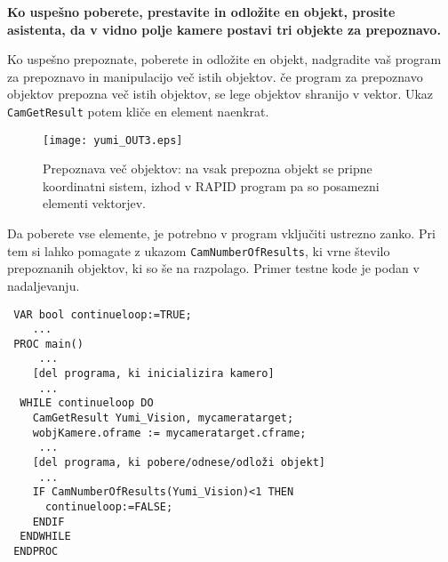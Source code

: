\vspace{5mm}
\begin{mdframed}[backgroundcolor=red!20, shadow=true,roundcorner=8pt]
\textbf{Ko uspešno poberete, prestavite in odložite en objekt, prosite asistenta, da v vidno polje kamere postavi tri objekte za prepoznavo.}
\end{mdframed}

Ko uspešno prepoznate, poberete in odložite en objekt, nadgradite vaš program za prepoznavo in manipulacijo več istih objektov.  če program za prepoznavo objektov prepozna več istih objektov, se lege objektov shranijo v vektor. Ukaz \verb"CamGetResult" potem kliče en element naenkrat.


\begin{figure}[!hbt]
\centering
\texttt{[image: yumi\_OUT3.eps]}
\caption{Prepoznava več objektov: na vsak prepozna objekt se pripne koordinatni sistem, izhod v RAPID program pa so posamezni elementi vektorjev.}
\label{fig:yumi_vision}
\end{figure}


Da poberete vse elemente, je potrebno v program vključiti ustrezno zanko. Pri tem si lahko pomagate z ukazom \verb"CamNumberOfResults", ki vrne število prepoznanih objektov, ki so še na razpolago. Primer testne kode je podan v nadaljevanju.




\begin{verbatim}
 VAR bool continueloop:=TRUE;
    ...
 PROC main()
     ...
    [del programa, ki inicializira kamero]
     ...
  WHILE continueloop DO
    CamGetResult Yumi_Vision, mycameratarget;
    wobjKamere.oframe := mycameratarget.cframe;
     ...
    [del programa, ki pobere/odnese/odloži objekt]
     ...
    IF CamNumberOfResults(Yumi_Vision)<1 THEN
      continueloop:=FALSE;
    ENDIF
  ENDWHILE
 ENDPROC
\end{verbatim}


